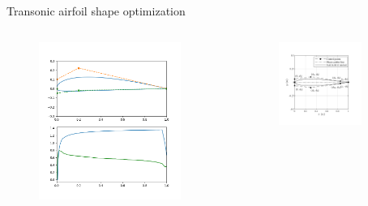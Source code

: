 \documentclass[8pt]{beamer}
\begin{document}
\begin{frame}{Transonic airfoil shape optimization}
  \begin{columns}[T]
    \begin{column}{0.5\textwidth}
      \vspace{-1em}
      \begin{figure}[H]
        \includegraphics[width=0.9\textwidth]
        {Figures/results.png}
        \end{figure}
    \end{column}
    \begin{column}{0.5\textwidth}
      \begin{center}
        \begin{figure}[H]
        \includegraphics[width=0.8\textwidth]
        {Figures/Fig20-b.pdf}
        \end{figure}
      \end{center}
    \end{column}
  \end{columns}
\end{frame}
\end{document}
